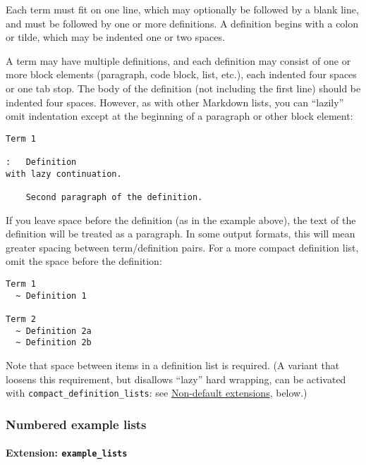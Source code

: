\documentclass[
]{article}
\begin{document}
Each term must fit on one line, which may optionally be followed by a
blank line, and must be followed by one or more definitions. A
definition begins with a colon or tilde, which may be indented one or
two spaces.

A term may have multiple definitions, and each definition may consist of
one or more block elements (paragraph, code block, list, etc.), each
indented four spaces or one tab stop. The body of the definition (not
including the first line) should be indented four spaces. However, as
with other Markdown lists, you can ``lazily'' omit indentation except at
the beginning of a paragraph or other block element:

\begin{verbatim}
Term 1

:   Definition
with lazy continuation.

    Second paragraph of the definition.
\end{verbatim}

If you leave space before the definition (as in the example above), the
text of the definition will be treated as a paragraph. In some output
formats, this will mean greater spacing between term/definition pairs.
For a more compact definition list, omit the space before the
definition:

\begin{verbatim}
Term 1
  ~ Definition 1

Term 2
  ~ Definition 2a
  ~ Definition 2b
\end{verbatim}

Note that space between items in a definition list is required. (A
variant that loosens this requirement, but disallows ``lazy'' hard
wrapping, can be activated with \texttt{compact\_definition\_lists}: see
\protect\hyperlink{non-default-extensions}{Non-default extensions},
below.)

\hypertarget{numbered-example-lists}{%
\subsubsection{Numbered example lists}\label{numbered-example-lists}}

\hypertarget{extension-example_lists}{%
\paragraph{\texorpdfstring{Extension:
\texttt{example\_lists}}{Extension: example\_lists}}\label{extension-example_lists}}
\end{document}
